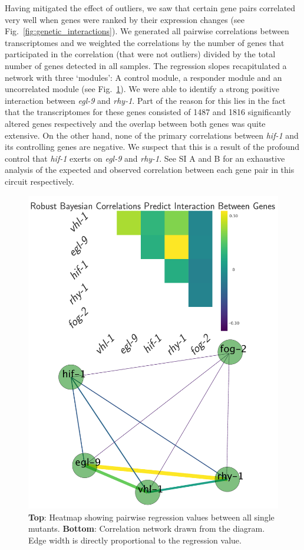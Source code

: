 \documentclass[9pt,twocolumn,twoside]{pnas-new}
\newcommand{\egl}{\emph{egl-9}}
\newcommand{\rhy}{\emph{rhy-1}}
\newcommand{\hif}{\emph{hif-1}}
\newcommand{\egln}{1487}
\newcommand{\rhyn}{1816}
\begin{document}
Having mitigated the effect of outliers, we saw that certain gene pairs correlated very well when genes were ranked by their expression changes (see Fig.~\ref{fig:genetic_interactions}). We generated all pairwise correlations between transcriptomes and we weighted the correlations by the number of genes that participated in the correlation (that were not outliers) divided by the total number of genes detected in all samples.
The regression slopes recapitulated a network with three `modules': A control module, a responder module and an uncorrelated module (see Fig.~\ref{fig:heatmap}). We were able to identify a strong positive interaction between \egl{} and \rhy{}. Part of the reason for this lies in the fact that the transcriptomes for these genes consisted of \egln{} and \rhyn{} significantly altered genes respectively and the overlap between both genes was quite extensive.
On the other hand, none of the primary correlations between \hif{} and its controlling genes are negative. We suspect that this is a result of the profound control that \hif{} exerts on \egl{} and \rhy{}. See SI A and B for an exhaustive analysis of the expected and observed correlation between each gene pair in this circuit respectively.
\begin{figure}[tbhp]
\centering
\includegraphics[width=0.85\linewidth]{figs/bayesian_heat_map.pdf}
\caption{\textbf{Top}: Heatmap showing pairwise regression values between all single mutants. \textbf{Bottom}: Correlation network drawn from the diagram. Edge width is directly proportional to the regression value.}
\label{fig:heatmap}
\end{figure}
\end{document}
